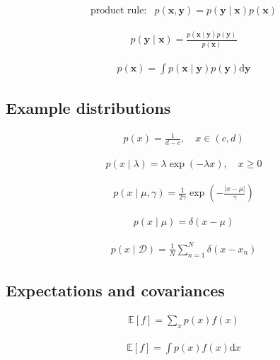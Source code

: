 \documentclass{article}
\begin{document}
\begin{align*}
\text{product rule:} & p(\mathbf{x}, \mathbf{y}) = p(\mathbf{y} \mid \mathbf{x}) p(\mathbf{x})
\tag{2.30}
\end{align*}

\begin{align*}
p(\mathbf{y} \mid \mathbf{x}) = \frac{p(\mathbf{x} \mid \mathbf{y}) p(\mathbf{y})}{p(\mathbf{x})}
\tag{2.31}
\end{align*}

\begin{align*}
p(\mathbf{x}) = \int p(\mathbf{x} \mid \mathbf{y}) p(\mathbf{y}) \mathrm{d} \mathbf{y}
\tag{2.32}
\end{align*}

\subsection{Example distributions}

\begin{align*}
p(x) = \frac{1}{d - c}, \quad x \in (c, d)
\tag{2.33}
\end{align*}

\begin{align*}
p(x \mid \lambda) = \lambda \exp(-\lambda x), \quad x \geqslant 0
\tag{2.34}
\end{align*}

\begin{align*}
p(x \mid \mu, \gamma) = \frac{1}{2 \gamma} \exp \left( -\frac{|x - \mu|}{\gamma} \right)
\tag{2.35}
\end{align*}

\begin{align*}
p(x \mid \mu) = \delta(x - \mu)
\tag{2.36}
\end{align*}

\begin{align*}
p(x \mid \mathcal{D}) = \frac{1}{N} \sum_{n=1}^{N} \delta\left( x - x_n \right)
\tag{2.37}
\end{align*}

\subsection{Expectations and covariances}

\begin{align*}
\mathbb{E}[f] = \sum_{x} p(x) f(x)
\tag{2.38}
\end{align*}

\begin{align*}
\mathbb{E}[f] = \int p(x) f(x) \mathrm{d} x
\tag{2.39}
\end{align*}
\end{document}
